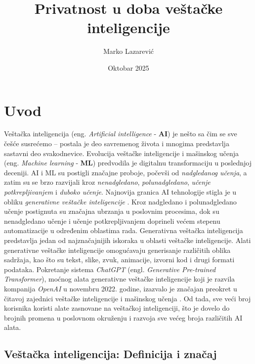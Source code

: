 \documentclass[a4paper,12pt]{article}
\title{Privatnost u doba veštačke inteligencije}
\author{Marko Lazarević}
\date{Oktobar 2025}
\begin{document}
\maketitle
\newpage
\tableofcontents
\newpage

\section{Uvod}

Veštačka inteligencija (eng. \textit{Artificial intelligence} - \textbf{AI}) je nešto sa čim se sve češće susrećemo – postala je deo savremenog života i mnogima predstavlja sastavni deo svakodnevice. Evolucija veštačke inteligencije i mašinskog učenja (eng. \textit{Machine learning} - \textbf{ML}) predvodila je digitalnu transformaciju u poslednjoj deceniji. AI i ML su postigli značajne proboje, počevši od \textit{nadgledanog učenja}, a zatim su se brzo razvijali kroz \textit{nenadgledano}, \textit{polunadgledano}, \textit{učenje potkrepljivanjem} i \textit{duboko učenje}. Najnovija granica AI tehnologije stigla je u obliku \textit{generativne veštačke inteligencije} \cite{10198233}. Kroz nadgledano i polunadgledano učenje postignuta su značajna ubrzanja u poslovnim procesima, dok su nenadgledano učenje i učenje potkrepljivanjem doprineli većem stepenu automatizacije u određenim oblastima rada. Generativna veštačka inteligencija predstavlja jedan od najznačajnijih iskoraka u oblasti veštačke inteligencije. Alati generativne veštačke inteligencije omogućavaju generisanje različitih oblika sadržaja, kao što su tekst, slike, zvuk, animacije, izvorni kod i drugi formati podataka. Pokretanje sistema \textit{ChatGPT} (engl. \textit{Generative Pre-trained Transformer}), moćnog alata generativne veštačke inteligencije koji je razvila kompanija \textit{OpenAI} u novembru 2022. godine, izazvalo je značajan preokret u čitavoj zajednici veštačke inteligencije i mašinskog učenja \cite{10198233}. Od tada, sve veći broj korisnika koristi alate zasnovane na veštačkoj inteligenciji, što je dovelo do brojnih promena u poslovnom okruženju i razvoja sve većeg broja različitih AI alata.

\subsection{Veštačka inteligencija: Definicija i značaj}

\end{document}
